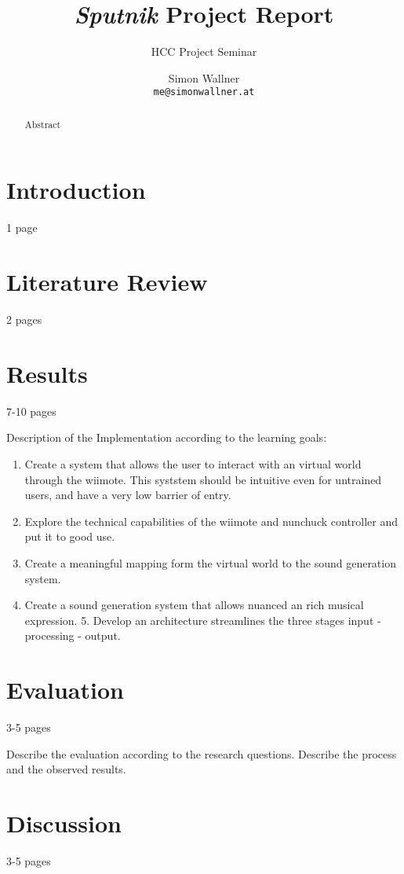 \documentclass[10pt,a4paper]{scrartcl}
\author{Simon Wallner\\\small{\texttt{me@simonwallner.at}}}
\title{\emph{Sputnik} Project Report}
\subtitle{HCC Project Seminar}
\begin{document}
\maketitle

\begin{abstract}
Abstract
\end{abstract}

\section{Introduction}
1 page

\section{Literature Review}
2 pages

\section{Results}
7-10 pages

Description of the Implementation according to the learning goals:

\begin{enumerate}
\item Create a system that allows the user to interact with an virtual world through the wiimote. This syststem should be intuitive even for untrained users, and have a very low barrier of entry.

\item Explore the technical capabilities of the wiimote and nunchuck controller and put it to good use.

\item Create a meaningful mapping form the virtual world to the sound generation system.

\item Create a sound generation system that allows nuanced an rich musical expression. 5. Develop an architecture streamlines the three stages input - processing - output.
\end{enumerate}

\section{Evaluation}
3-5 pages

Describe the evaluation according to the research questions. Describe the process and the observed results.


\section{Discussion}
3-5 pages
\end{document}
